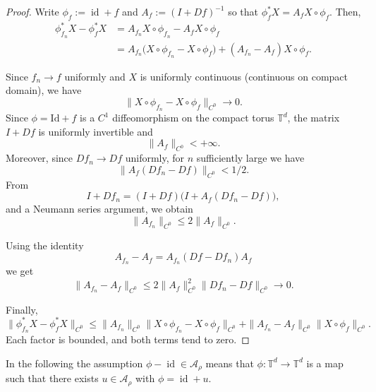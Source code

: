 \documentclass[12pt,reqno,a4paper]{amsart}%
\numberwithin{equation}{section}
\newcommand{\Tt}{{\mathbb{T}}}
\newcommand{\id}  {\operatorname{id}}
\begin{document}
\begin{proof}
Write $\phi_f := \id + f$ and $A_f := (I + Df)^{-1}$ so that $\phi_f^*X = A_f  X\circ\phi_f$.
Then,
\begin{align*}
\phi_{f_n}^*X - \phi_f^*X
&= A_{f_n}X\circ \phi_{f_n} - A_fX\circ \phi_f\\
&= A_{f_n}\bigl(X\circ \phi_{f_n} - X\circ \phi_f\bigr)
+ (A_{f_n} - A_f)X\circ \phi_f.
\end{align*}

Since $f_n \to f$ uniformly and $X$ is uniformly continuous (continuous on compact domain), we have
\[
\|X\circ \phi_{f_n} - X\circ \phi_f\|_{C^0} \to 0.
\]
Since $\phi = \mathrm{Id} + f$ is a $C^1$ diffeomorphism on the compact torus $\Tt^d$, the matrix $I + Df$ is uniformly invertible and
\[
\|A_f\|_{C^0}  < +\infty.
\]
Moreover, since $Df_n \to Df$ uniformly, for $n$ sufficiently large we have
\[
\| A_f(Df_n - Df) \|_{C^0} < 1/2.
\]
From
\[
I + Df_n = (I + Df)\big(I + A_f(Df_n - Df)\big),
\]
and a Neumann series argument, we obtain
\[
\|A_{f_n}\|_{C^0} \le 2 \|A_f\|_{C^0}.
\]


Using the identity
\[
A_{f_n} - A_f
= A_{f_n}(Df - Df_n)A_f
\]
we get
\[
\|A_{f_n} - A_f\|_{C^0}
\le 2 \|A_{f}\|_{C^0}^2 \|Df_n - Df\|_{C^0} \to 0.
\]

Finally, 
\[
\|\phi_{f_n}^*X - \phi_f^*X\|_{C^0}
\le 
\|A_{f_n}\|_{C^0} \|X\circ \phi_{f_n} - X\circ \phi_f\|_{C^0}
+ \|A_{f_n} - A_f\|_{C^0} \|X\circ \phi_f\|_{C^0}.
\]
Each factor is bounded, and both terms tend to zero. 
\end{proof}


In the following the assumption $\phi-\id\in\mathcal A_{\rho}$  means that $\phi\colon\Tt^d\rightarrow\Tt^d$ is a map such that there exists $u\in\mathcal A_{\rho}$ with $\phi=\id+u$.
\end{document}
